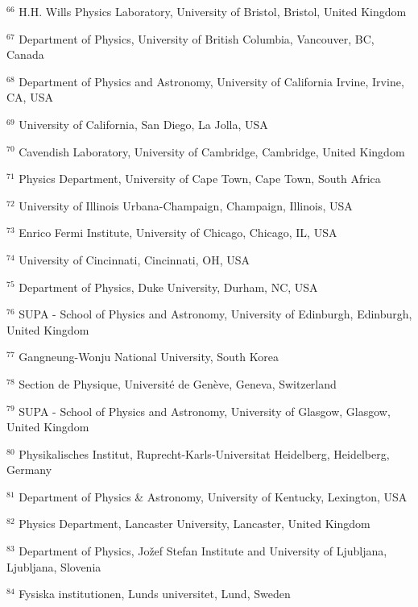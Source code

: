 \par {\footnotesize $^{66}$ H.H. Wills Physics Laboratory, University of Bristol, Bristol, United Kingdom}
\par {\footnotesize $^{67}$ Department of Physics, University of British Columbia, Vancouver, BC, Canada}
\par {\footnotesize $^{68}$ Department of Physics and Astronomy, University of California Irvine, Irvine, CA, USA}
\par {\footnotesize $^{69}$ University of California, San Diego, La Jolla, USA}
\par {\footnotesize $^{70}$ Cavendish Laboratory, University of Cambridge, Cambridge, United Kingdom}
\par {\footnotesize $^{71}$ Physics Department, University of Cape Town, Cape Town, South Africa}
\par {\footnotesize $^{72}$ University of Illinois Urbana-Champaign, Champaign, Illinois, USA}
\par {\footnotesize $^{73}$ Enrico Fermi Institute, University of Chicago, Chicago, IL, USA}
\par {\footnotesize $^{74}$ University of Cincinnati, Cincinnati, OH, USA}
\par {\footnotesize $^{75}$ Department of Physics, Duke University, Durham, NC, USA}
\par {\footnotesize $^{76}$ SUPA - School of Physics and Astronomy, University of Edinburgh, Edinburgh, United Kingdom}
\par {\footnotesize $^{77}$ Gangneung-Wonju National University, South Korea}
\par {\footnotesize $^{78}$ Section de Physique, Université de Genève, Geneva, Switzerland}
\par {\footnotesize $^{79}$ SUPA - School of Physics and Astronomy, University of Glasgow, Glasgow, United Kingdom}
\par {\footnotesize $^{80}$ Physikalisches Institut, Ruprecht-Karls-Universitat Heidelberg, Heidelberg, Germany}
\par {\footnotesize $^{81}$ Department of Physics \& Astronomy, University of Kentucky, Lexington, USA}
\par {\footnotesize $^{82}$ Physics Department, Lancaster University, Lancaster, United Kingdom}
\par {\footnotesize $^{83}$ Department of Physics, Jožef Stefan Institute and University of Ljubljana, Ljubljana, Slovenia}
\par {\footnotesize $^{84}$ Fysiska institutionen, Lunds universitet, Lund, Sweden}
